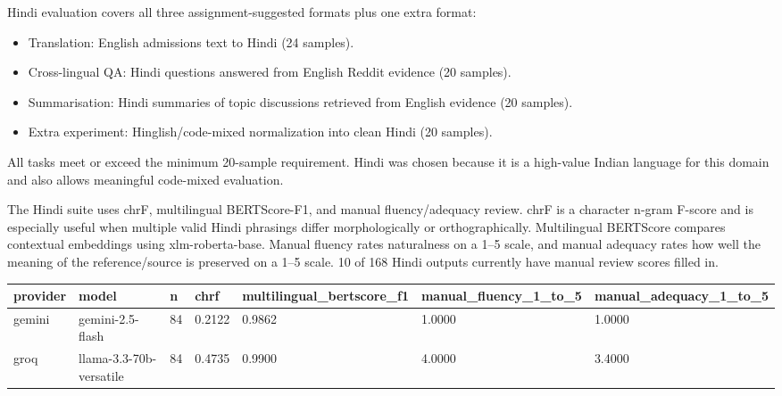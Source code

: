 \documentclass[11pt]{article}
\begin{document}
        Hindi evaluation covers all three assignment-suggested formats plus one extra format:
        \begin{itemize}
        \item Translation: English admissions text to Hindi (24 samples).
        \item Cross-lingual QA: Hindi questions answered from English Reddit evidence (20 samples).
        \item Summarisation: Hindi summaries of topic discussions retrieved from English evidence (20 samples).
        \item Extra experiment: Hinglish/code-mixed normalization into clean Hindi (20 samples).
        \end{itemize}
        All tasks meet or exceed the minimum 20-sample requirement. Hindi was chosen because it is a high-value Indian language for this domain and also allows meaningful code-mixed evaluation.

        The Hindi suite uses chrF, multilingual BERTScore-F1, and manual fluency/adequacy review. chrF is a character n-gram F-score and is especially useful when multiple valid Hindi phrasings differ morphologically or orthographically. Multilingual BERTScore compares contextual embeddings using xlm-roberta-base. Manual fluency rates naturalness on a 1--5 scale, and manual adequacy rates how well the meaning of the reference/source is preserved on a 1--5 scale. 10 of 168 Hindi outputs currently have manual review scores filled in.

        \begin{center}
\small\begin{tabular}{p{}|p{}|p{}|p{}|p{}|p{}|p{}}
\hline
provider & model & n & chrf & multilingual\_bertscore\_f1 & manual\_fluency\_1\_to\_5 & manual\_adequacy\_1\_to\_5 \\ \hline
gemini & gemini-2.5-flash & 84 & 0.2122 & 0.9862 & 1.0000 & 1.0000 \\ \hline
groq & llama-3.3-70b-versatile & 84 & 0.4735 & 0.9900 & 4.0000 & 3.4000 \\ \hline
\end{tabular}
\end{center}
\end{document}
